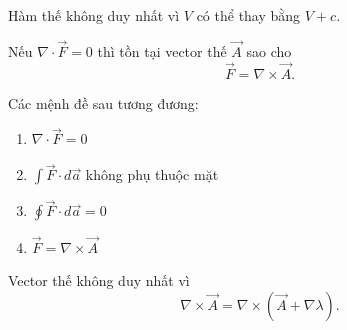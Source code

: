\begin{enumerate}
Hàm thế không duy nhất vì $V$ có thể thay bằng $V+c$.

Nếu $\nabla \cdot \vec{F} = 0$ thì tồn tại vector thế $\vec{A}$ sao cho
\[
\vec{F} = \nabla \times \vec{A}.
\]

\begin{theorem}
Các mệnh đề sau tương đương:
\begin{enumerate}
\item[(a)] $\nabla \cdot \vec{F} = 0$
\item[(b)] $\displaystyle \int \vec{F} \cdot d\vec{a}$ không phụ thuộc mặt
\item[(c)] $\displaystyle \oint \vec{F} \cdot d\vec{a} = 0$
\item[(d)] $\vec{F} = \nabla \times \vec{A}$
\end{enumerate}
\end{theorem}

Vector thế không duy nhất vì
\[
\nabla \times \vec{A} = \nabla \times (\vec{A} + \nabla \lambda).
\]

\end{enumerate}